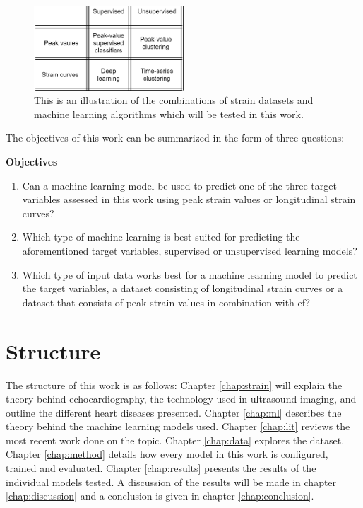 \begin{figure}[H]
    \centering
    \includegraphics[width=0.5\textwidth]{intro/objectives_diagram.png}
    \caption{This is an illustration of the combinations of strain datasets and machine learning algorithms which will be tested in this work.}
    \label{fig:objectives_diagram}
\end{figure}

The objectives of this work can be summarized in the form of three questions:

\begin{tcolorbox}
    \textbf{Objectives}

    \begin{enumerate}
        \item Can a machine learning model be used to predict one of the three target variables assessed in this work using peak strain values or longitudinal strain curves?
        \item Which type of machine learning is best suited for predicting the aforementioned target variables, supervised or unsupervised learning models?
        \item Which type of input data works best for a machine learning model to predict the target variables, a dataset consisting of longitudinal strain curves or a dataset that consists of peak strain values in combination with \acrshort{ef}?
    \end{enumerate}
\end{tcolorbox}

\section{Structure}

The structure of this work is as follows: Chapter \ref{chap:strain} will explain the theory behind echocardiography, the technology used in ultrasound imaging, and outline the different heart diseases presented. Chapter \ref{chap:ml} describes the theory behind the machine learning models used. Chapter \ref{chap:lit} reviews the most recent work done on the topic. Chapter \ref{chap:data} explores the dataset. Chapter \ref{chap:method} details how every model in this work is configured, trained and evaluated. Chapter \ref{chap:results} presents the results of the individual models tested. A discussion of the results will be made in chapter \ref{chap:discussion} and a conclusion is given in chapter \ref{chap:conclusion}.